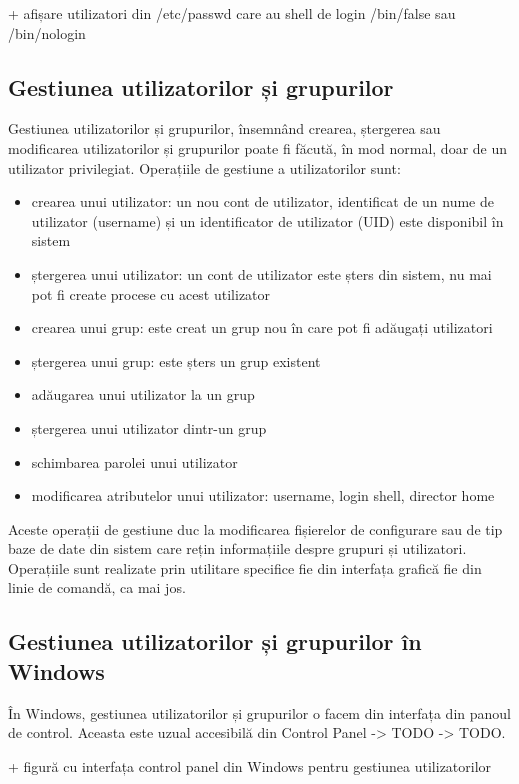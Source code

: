 + afișare utilizatori din /etc/passwd care au shell de login /bin/false sau /bin/nologin

\subsection{Gestiunea utilizatorilor și grupurilor}
\label{sec:users-ops-groups}

Gestiunea utilizatorilor și grupurilor, însemnând crearea, ștergerea sau
modificarea utilizatorilor și grupurilor poate fi făcută, în mod normal, doar de
un utilizator privilegiat. Operațiile de gestiune a utilizatorilor sunt:

\begin{itemize}
	\item crearea unui utilizator: un nou cont de utilizator, identificat de
		un nume de utilizator (username) și un identificator de
		utilizator (UID) este disponibil în sistem
	\item ștergerea unui utilizator: un cont de utilizator este șters din
		sistem, nu mai pot fi create procese cu acest utilizator
	\item crearea unui grup: este creat un grup nou în care pot fi adăugați utilizatori
	\item ștergerea unui grup: este șters un grup existent
	\item adăugarea unui utilizator la un grup
	\item ștergerea unui utilizator dintr-un grup
	\item schimbarea parolei unui utilizator
	\item modificarea atributelor unui utilizator: username, login shell,
		director home
\end{itemize}
Aceste operații de gestiune duc la modificarea fișierelor de configurare sau de
tip baze de date din sistem care rețin informațiile despre grupuri și
utilizatori. Operațiile sunt realizate prin utilitare specifice fie din
interfața grafică fie din linie de comandă, ca mai jos.

\subsection{Gestiunea utilizatorilor și grupurilor în Windows}
\label{sec:users-ops-windows}

În Windows, gestiunea utilizatorilor și grupurilor o facem din interfața din
panoul de control. Aceasta este uzual accesibilă din Control Panel -> TODO ->
TODO.

+ figură cu interfața control panel din Windows pentru gestiunea utilizatorilor

